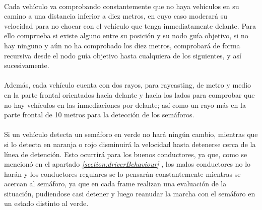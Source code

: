 	\paragraph{}
	Cada vehículo va comprobando constantemente que no haya vehículos en su camino a una distancia inferior a diez metros, en cuyo caso moderará su velocidad para no chocar con el vehículo que tenga inmediatamente delante. Para ello comprueba si existe alguno entre su posición y su nodo guía objetivo, si no hay ninguno y aún no ha comprobado los diez metros, comprobará de forma recursiva desde el nodo guía objetivo hasta cualquiera de los siguientes, y así sucesivamente.
	
	\paragraph{}
	Además, cada vehículo cuenta con dos rayos, para raycasting, de metro y medio en la parte frontal orientados hacia delante y hacia los lados para comprobar que no hay vehículos en las inmediaciones por delante; así como un rayo más en la parte frontal de 10 metros para la detección de los semáforos.
	
	\paragraph{}
	Si un vehículo detecta un semáforo en verde no hará ningún cambio, mientras que si lo detecta en naranja o rojo disminuirá la velocidad hasta detenerse cerca de la línea de detención. Esto ocurrirá para los buenos conductores, ya que, como se mencionó en el apartado \emph{\ref{section:driverBehaviour} }, los malos conductores no lo harán y los conductores regulares se lo pensarán constantemente mientras se acercan al semáforo, ya que en cada frame realizan una evaluación de la situación, pudiendose casi detener y luego reanudar la marcha con el semáforo en un estado distinto al verde.